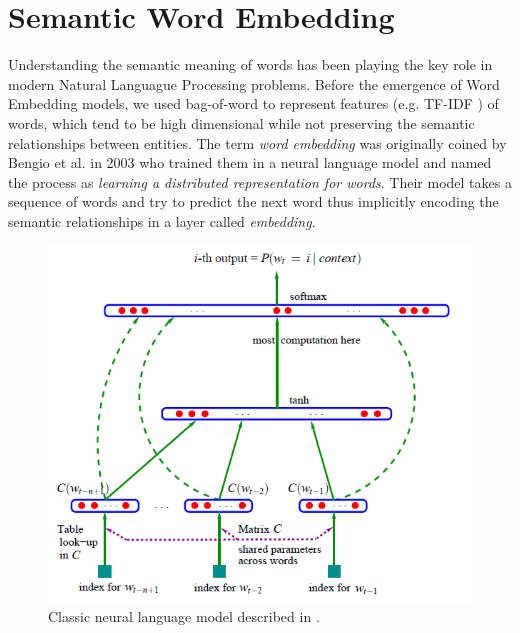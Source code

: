 \section{Semantic Word Embedding}
Understanding the semantic meaning of words has been playing the key role in modern Natural Languague Processing problems. Before the emergence of Word Embedding models, we used bag-of-word to represent features (e.g. TF-IDF \cite{tfidf}) of words, which tend to be high dimensional while not preserving the semantic relationships between entities. The term \textit{word embedding} was originally coined by Bengio et al. \cite{bengio2003} in 2003 who trained them in a neural language model and named the process as \emph{learning a distributed representation for words}. Their model takes a sequence of words and try to predict the next word thus implicitly encoding the semantic relationships in a layer called \emph{embedding}. 

\begin{figure}
\centering
\includegraphics[scale=0.5]{charts/bengio_language_model.png}
\caption{Classic neural language model described in \cite{bengio2003}.}
\end{figure}

